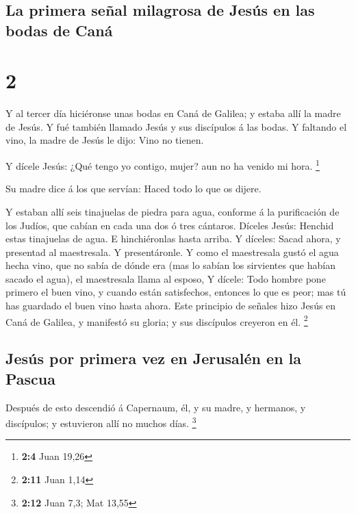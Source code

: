 \hypertarget{la-primera-seuxf1al-milagrosa-de-jesuxfas-en-las-bodas-de-canuxe1}{%
\subsection{La primera señal milagrosa de Jesús en las bodas de
Caná}\label{la-primera-seuxf1al-milagrosa-de-jesuxfas-en-las-bodas-de-canuxe1}}

\hypertarget{section-1}{%
\section{2}\label{section-1}}

 Y al tercer día hiciéronse unas bodas en Caná de Galilea;
y estaba allí la madre de Jesús.  Y fué también llamado
Jesús y sus discípulos á las bodas.  Y faltando el vino,
la madre de Jesús le dijo: Vino no tienen.

 Y dícele Jesús: ¿Qué tengo yo contigo, mujer? aun no ha
venido mi hora. \footnote{\textbf{2:4} Juan 19,26}

 Su madre dice á los que servían: Haced todo lo que os
dijere.

 Y estaban allí seis tinajuelas de piedra para agua,
conforme á la purificación de los Judíos, que cabían en cada una dos ó
tres cántaros.  Díceles Jesús: Henchid estas tinajuelas de
agua. E hinchiéronlas hasta arriba.  Y díceles: Sacad
ahora, y presentad al maestresala. Y presentáronle.  Y
como el maestresala gustó el agua hecha vino, que no sabía de dónde era
(mas lo sabían los sirvientes que habían sacado el agua), el maestresala
llama al esposo,  Y dícele: Todo hombre pone primero el
buen vino, y cuando están satisfechos, entonces lo que es peor; mas tú
has guardado el buen vino hasta ahora.  Este principio de
señales hizo Jesús en Caná de Galilea, y manifestó su gloria; y sus
discípulos creyeron en él. \footnote{\textbf{2:11} Juan 1,14}

\hypertarget{jesuxfas-por-primera-vez-en-jerusaluxe9n-en-la-pascua}{%
\subsection{Jesús por primera vez en Jerusalén en la
Pascua}\label{jesuxfas-por-primera-vez-en-jerusaluxe9n-en-la-pascua}}

 Después de esto descendió á Capernaum, él, y su madre, y
hermanos, y discípulos; y estuvieron allí no muchos días. \footnote{\textbf{2:12}
  Juan 7,3; Mat 13,55}

